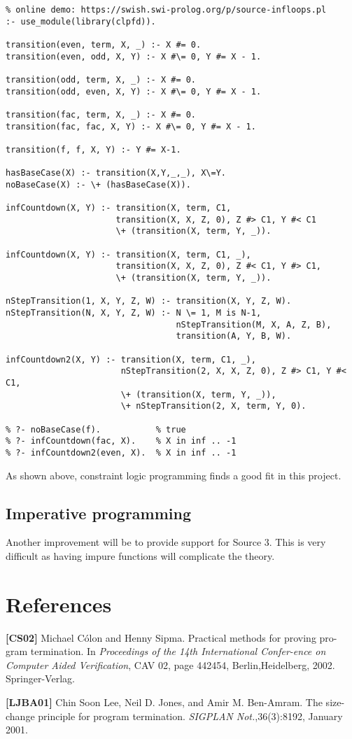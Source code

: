 \begin{lstlisting}
% online demo: https://swish.swi-prolog.org/p/source-infloops.pl 
:- use_module(library(clpfd)).

transition(even, term, X, _) :- X #= 0.
transition(even, odd, X, Y) :- X #\= 0, Y #= X - 1.

transition(odd, term, X, _) :- X #= 0.
transition(odd, even, X, Y) :- X #\= 0, Y #= X - 1.

transition(fac, term, X, _) :- X #= 0.
transition(fac, fac, X, Y) :- X #\= 0, Y #= X - 1.

transition(f, f, X, Y) :- Y #= X-1.

hasBaseCase(X) :- transition(X,Y,_,_), X\=Y.
noBaseCase(X) :- \+ (hasBaseCase(X)).

infCountdown(X, Y) :- transition(X, term, C1, 
                      transition(X, X, Z, 0), Z #> C1, Y #< C1
                      \+ (transition(X, term, Y, _)).

infCountdown(X, Y) :- transition(X, term, C1, _),
                      transition(X, X, Z, 0), Z #< C1, Y #> C1,
                      \+ (transition(X, term, Y, _)).

nStepTransition(1, X, Y, Z, W) :- transition(X, Y, Z, W).
nStepTransition(N, X, Y, Z, W) :- N \= 1, M is N-1,
                                  nStepTransition(M, X, A, Z, B),
                                  transition(A, Y, B, W).

infCountdown2(X, Y) :- transition(X, term, C1, _),
                       nStepTransition(2, X, X, Z, 0), Z #> C1, Y #< C1,
                       \+ (transition(X, term, Y, _)),
                       \+ nStepTransition(2, X, term, Y, 0).

% ?- noBaseCase(f).           % true
% ?- infCountdown(fac, X).    % X in inf .. -1
% ?- infCountdown2(even, X).  % X in inf .. -1
\end{lstlisting}

As shown above, constraint logic programming finds a good fit in this project. 

\subsection{Imperative programming}
Another improvement will be to provide support for Source 3. This is very difficult
as having impure functions will complicate the theory.

\section{References}
\textbf{[CS02]} Michael C\'olon and Henny Sipma. Practical methods for proving pro-gram termination.  In {\it Proceedings  of  the  14th  International  Confer-ence on Computer Aided Verification}, CAV 02, page 442454, Berlin,Heidelberg, 2002. Springer-Verlag.



\textbf{[LJBA01]}  Chin  Soon  Lee,  Neil  D.  Jones,  and  Amir  M.  Ben-Amram.    The size-change  principle  for  program  termination. {\it SIGPLAN  Not.},36(3):8192, January 2001.



